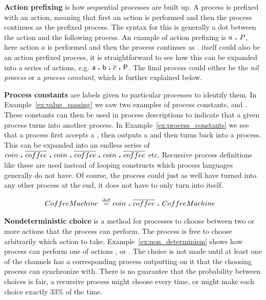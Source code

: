 	\textbf{Action prefixing} is how sequential processes are built up. A 
	process is prefixed with an action, meaning that first an action is 
	performed and then the process continues as the prefixed process. The syntax
	for this is generally a dot between the action and the following process. An 
	example of action prefixing is $a \ \textbf{.}\  P$, here action $a$ is performed
	and then the process continues as .  itself could also be an
	action prefixed process, it is straightforward to see how this can be
	expanded into a series of actions, e.g. 
	$\textsf{a} \ \textbf{.}\  \textsf{b} \ \textbf{.}\  \overline{c} \ \textbf{.}\  \textsf{P}$. The 
	final process  could either be the \textit{nil process} or a
	\textit{process constant}, which is further explained below.

	\textbf{Process constants} are labels given to particular processes to 
	identify them. In Example~\ref{ex:value_passing} we saw two examples of 
	process constants,  and . These constants can 
	then be used in process descriptions to indicate that a given process turns 
	into another process. In Example~\ref{ex:process_constants} we see that a 
	 process first accepts a , then outputs a 
	 and then turns back into a  process. 
	This can be expanded into an endless series of 
	$coin \ \textbf{.}\  \overline{coffee} \ \textbf{.}\  coin \ \textbf{.}\  \overline{coffee} \ \textbf{.}\  coin \ \textbf{.}\  \overline{coffee}$ 
	etc. Recursive process definitions like these are used instead of looping 
	constructs which process languages generally do not have.  Of course, the 
	 process could just as well have turned into any other 
	process at the end, it does not have to only turn into itself.
	
	\begin{Exa}\label{ex:process_constants}
	\begin{align*}
			CoffeeMachine \ \stackrel{\mathrm{def}}{=}\  & coin \ \textbf{.}\  \overline{coffee} \ \textbf{.}\  CoffeeMachine 
	\end{align*}	
	\end{Exa}

	\textbf{Nondeterministic choice} is a method for processes to choose between 
	two or more actions that the process can perform. The process is free to 
	choose arbitrarily which action to take. Example~\ref{ex:non_determinism} 
	shows how process  can perform one of actions , 
	 or . The choice is not made until at least one of the 
	channels has a corresponding process outputting on it that the choosing 
	process can synchronize with. There is no guarantee that the probability 
	between choices is fair, a recursive process might choose  every
	time, or might make each choice exactly 33\% of the time.
		
